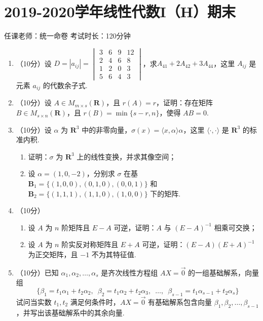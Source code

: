\section{2019-2020学年线性代数I（H）期末}

\begin{center}
    任课老师：统一命卷\hspace{4em} 考试时长：120分钟
\end{center}

\begin{enumerate}
    \item （10分）设 $D=|a_{ij}|=\begin{vmatrix}3 & 6 & 9 & 12 \\ 2 & 4 & 6 & 8 \\1 & 2 & 0 & 3 \\ 5 & 6 & 4 & 3\end{vmatrix}$，求$A_{41}+2A_{42}+3A_{44}$，这里 $A_{ij}$ 是元素 $a_{ij}$ 的代数余子式.

    \item （10分）设 $A \in M_{m \times s}(\mathbf{R})$，且 $r(A)=r$，证明：存在矩阵 $B \in M_{s \times n}(\mathbf{R})$，且 $r(B)=\min\{s-r, n\}$，使得 $AB=0$.

    \item （10分）设 $\alpha$ 为 $\mathbf{R}^3$ 中的非零向量，$\sigma(x)=\langle x, \alpha\rangle \alpha$，这里 $\langle\cdot, \cdot\rangle$ 是 $\mathbf{R}^3$ 的标准内积.
       \begin{enumerate}
        \item 证明：$\sigma$ 为 $\mathbf{R}^3$ 上的线性变换，并求其像空间；

        \item 设 $\alpha=(1, 0, -2)$，分别求 $\sigma$ 在基 $\mathbf{B}_1=\{(1, 0, 0), (0, 1, 0), (0, 0, 1)\}$ 和 $\mathbf{B}_2=\{(1, 1, 1), (1, 1, 0), (1, 0, 0)\}$ 下的矩阵.
    \end{enumerate}

    \item （10分）
    \begin{enumerate}
        \item 设 $A$ 为 $n$ 阶矩阵且 $E-A$ 可逆，证明：$A$ 与 $(E-A)^{-1}$ 相乘可交换；

        \item 设 $A$ 为 $n$ 阶实反对称矩阵且 $E+A$ 可逆，证明：$(E-A)(E+A)^{-1}$ 为正交矩阵，且 $-1$ 不为其特征值.
    \end{enumerate}

    \item （10分）已知 $\alpha_1,\alpha_2,\ldots,\alpha_s$ 是齐次线性方程组 $AX=\vec{0}$ 的一组基础解系，向量组
    \[\{\beta_1=t_1\alpha_1+t_2\alpha_2,\enspace \beta_2=t_1\alpha_2+t_2\alpha_3,\enspace \ldots,\enspace \beta_{s-1}=t_1\alpha_{s-1}+t_2\alpha_s\}\]
    试问当实数 $t_1,t_2$ 满足何条件时，$AX=\vec{0}$ 有基础解系包含向量 $\beta_1,\beta_2,\ldots,\beta_{s-1}$，并写出该基础解系中的其余向量.


\end{enumerate}

